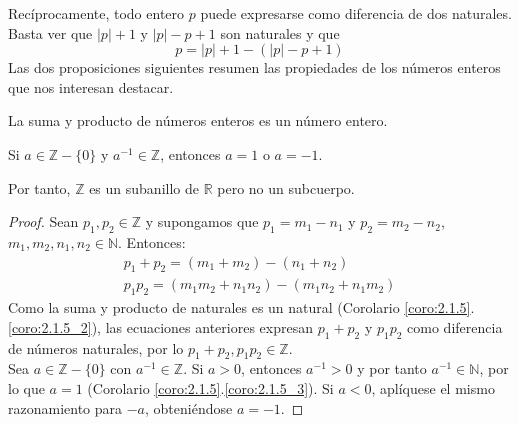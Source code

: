 Recíprocamente, todo entero $p$ puede expresarse como diferencia de dos naturales.
Basta ver que $|p|+1$ y $|p| -p + 1$ son naturales y que
\begin{equation*}
    p=|p|+1-(|p| -p + 1)
\end{equation*}
Las dos proposiciones siguientes resumen las propiedades de los números enteros que nos interesan destacar.
\begin{prop}\label{prop:3.1.2}
    La suma y producto de números enteros es un número entero.
    
    Si $a \in \mathbb{Z}-\{0\}$ y $a^{-1} \in \mathbb{Z}$, entonces $a = 1$ o $a = -1$.
    
    Por tanto, $\mathbb{Z}$ es un subanillo de $\mathbb{R}$ pero no un subcuerpo.
\end{prop}
\begin{proof}
    Sean $p_1,p_2 \in \mathbb{Z}$ y supongamos que $p_1=m_1-n_1$ y $p_2=m_2-n_2$, $m_1,m_2,n_1,n_2 \in \mathbb{N}$.
    Entonces:
    \begin{gather*}
        p_1+p_2=(m_1+m_2)-(n_1+n_2)\\
        p_1 p_2 = (m_1 m_2 + n_1 n_2) - (m_1 n_2 + n_1 m_2)
    \end{gather*}
    Como la suma y producto de naturales es un natural (Corolario \ref{coro:2.1.5}.\ref{coro:2.1.5_2}), las ecuaciones anteriores expresan $p_1+p_2$ y $p_1 p_2$ como diferencia de números naturales, por lo $p_1+p_2,p_1 p_2 \in \mathbb{Z}$.\\
    
    Sea $a \in \mathbb{Z}-\{0\}$ con $a^{-1} \in \mathbb{Z}$. Si $a > 0$, entonces
    $a^{-1} > 0$ y por tanto $a^{-1} \in \mathbb{N}$, por lo que $a=1$ (Corolario  \ref{coro:2.1.5}.\ref{coro:2.1.5_3}). Si $a < 0$, aplíquese el mismo razonamiento para $-a$, obteniéndose $a=-1$.
\end{proof}

